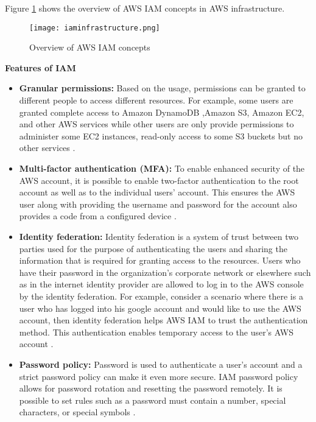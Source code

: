 Figure \ref{fig:iamidentities} shows the overview of AWS IAM concepts in AWS infrastructure.


\begin{figure}
    \centering
    \texttt{[image: iaminfrastructure.png]}
    \caption{Overview of AWS IAM concepts}{\cite{28}}
    \label{fig:iamidentities}
\end{figure}


\hfill \break

\textbf{Features of IAM}

\begin{itemize}
    \item \textbf{Granular permissions:} Based on the usage, permissions can be granted to different people to access
    different resources. For example, some users are granted complete access to Amazon DynamoDB ,Amazon S3, Amazon EC2, and other AWS services while other users are only
    provide permissions to administer some EC2 instances, read-only access to some S3 buckets but no other services \cite{27}.
\end{itemize}
\begin{itemize}
    \item \textbf{Multi-factor authentication (MFA):} To enable enhanced security of the AWS account, it is possible
    to enable
    two-factor authentication to the root account as well as to the individual users’ account. This ensures the AWS user along with providing the username and password for the account also provides a code from a configured device \cite{27}.
\end{itemize}
\begin{itemize}
    \item \textbf{Identity federation:} Identity federation is a system of trust between two parties used for the purpose of authenticating the users and sharing the information that is required for granting access to the resources.
    Users who have their password in the organization's
    corporate network or elsewhere such as in the
    internet identity provider are allowed to log in to the AWS console by the identity federation.
    For example, consider a scenario where there is a user who has logged into his google account and would like to use the AWS account, then identity federation helps AWS IAM to trust the authentication method.
    This authentication enables temporary access to the user’s AWS account \cite{27}.
\end{itemize}
\begin{itemize}
    \item \textbf{Password policy:} Password is used to authenticate a user’s account and a strict password policy
    can make it
    even more secure. IAM password policy allows for password rotation and resetting the password remotely. It is
    possible to set rules such as a password must contain a number, special characters, or special symbols \cite{27}.
\end{itemize}


